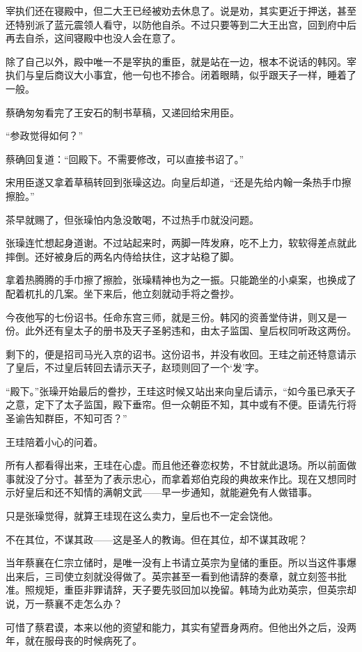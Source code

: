 宰执们还在寝殿中，但二大王已经被劝去休息了。说是劝，其实更近于押送，甚至还特别派了蓝元震领人看守，以防他自杀。不过只要等到二大王出宫，回到府中后再去自杀，这间寝殿中也没人会在意了。

除了自己以外，殿中唯一不是宰执的重臣，就是站在一边，根本不说话的韩冈。宰执们与皇后商议大小事宜，他一句也不掺合。闭着眼睛，似乎跟天子一样，睡着了一般。

蔡确匆匆看完了王安石的制书草稿，又递回给宋用臣。

“参政觉得如何？”

蔡确回复道：“回殿下。不需要修改，可以直接书诏了。”

宋用臣遂又拿着草稿转回到张璪这边。向皇后却道，“还是先给内翰一条热手巾擦擦脸。”

茶早就赐了，但张璪怕内急没敢喝，不过热手巾就没问题。

张璪连忙想起身道谢。不过站起来时，两脚一阵发麻，吃不上力，软软得差点就此摔倒。还好被身后的两名内侍给扶住，这才站稳了脚。

拿着热腾腾的手巾擦了擦脸，张璪精神也为之一振。只能跪坐的小桌案，也换成了配着杌扎的几案。坐下来后，他立刻就动手将之誊抄。

今夜他写的七份诏书。任命东宫三师，就是三份。韩冈的资善堂侍讲，则又是一份。此外还有皇太子的册书及天子圣躬违和，由太子监国、皇后权同听政这两份。

剩下的，便是招司马光入京的诏书。这份诏书，并没有收回。王珪之前还特意请示了皇后，不过皇后转回去请示天子，赵顼则回了一个‘发’字。

“殿下。”张璪开始最后的誊抄，王珪这时候又站出来向皇后请示，“如今虽已承天子之意，定下了太子监国，殿下垂帘。但一众朝臣不知，其中或有不便。臣请先行将圣谕告知群臣，不知可否？”

王珪陪着小心的问着。

所有人都看得出来，王珪在心虚。而且他还眷恋权势，不甘就此退场。所以前面做事就没了分寸。甚至为了表示忠心，而拿着郑伯克段的典故来作比。现在又想同时示好皇后和还不知情的满朝文武——早一步通知，就能避免有人做错事。

只是张璪觉得，就算王珪现在这么卖力，皇后也不一定会饶他。

不在其位，不谋其政——这是圣人的教诲。但在其位，却不谋其政呢？

当年蔡襄在仁宗立储时，是唯一没有上书请立英宗为皇储的重臣。所以当这件事爆出来后，三司使立刻就没得做了。英宗甚至一看到他请辞的奏章，就立刻签书批准。照规矩，重臣非罪请辞，天子要先驳回加以挽留。韩琦为此劝英宗，但英宗却说，万一蔡襄不走怎么办？

可惜了蔡君谟，本来以他的资望和能力，其实有望晋身两府。但他出外之后，没两年，就在服母丧的时候病死了。

